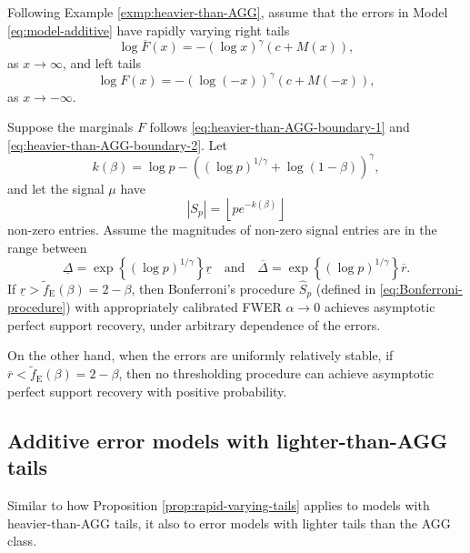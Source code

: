 Following Example \ref{exmp:heavier-than-AGG}, assume that the errors in Model \eqref{eq:model-additive} have rapidly varying right tails
\begin{equation} \label{eq:heavier-than-AGG-boundary-1}
    \log{\overline{F}(x)} = - \left(\log x\right)^\gamma \left(c+M(x)\right),
\end{equation}
as $x\to \infty$, and left tails
\begin{equation} \label{eq:heavier-than-AGG-boundary-2}
    \log{{F}(x)} = - \left(\log{(-x)}\right)^\gamma \left(c+M(-x)\right),
\end{equation}
as $x\to -\infty$.

\begin{theorem} \label{thm:heavier-than-AGG}
Suppose the marginals $F$ follows \eqref{eq:heavier-than-AGG-boundary-1} and \eqref{eq:heavier-than-AGG-boundary-2}.
Let
$$
k(\beta) = \log{p} - \left((\log{p})^{1/\gamma} + \log{(1-\beta)}\right)^\gamma,
$$
and let the signal $\mu$ have 
$$|S_p| = \left\lfloor pe^{-k(\beta)} \right\rfloor$$
non-zero entries. Assume the magnitudes of non-zero signal entries are in the range between
$$\underline{\Delta} = \exp{\left\{(\log{p})^{1/\gamma}\right\}}\underline{r}
\quad\text{and}\quad
\overline{\Delta} = \exp{\left\{(\log{p})^{1/\gamma}\right\}}\overline{r}.$$
If $\underline{r} > \widetilde{f}_{\mathrm{E}}(\beta) = 2 - \beta$, then Bonferroni's procedure $\widehat{S}_p$ (defined in \eqref{eq:Bonferroni-procedure}) with appropriately calibrated FWER $\alpha\to 0$ achieves asymptotic perfect support recovery, under arbitrary dependence of the errors.

On the other hand, when the errors are uniformly relatively stable, if $\overline{r} < \widetilde{f}_{\mathrm{E}}(\beta) = 2 - \beta$, then no thresholding procedure can achieve asymptotic perfect support recovery with positive probability.
\end{theorem}


\subsection{Additive error models with lighter-than-AGG tails}


Similar to how Proposition \ref{prop:rapid-varying-tails} applies to models with heavier-than-AGG tails, it also to error models with lighter tails than the AGG class.

